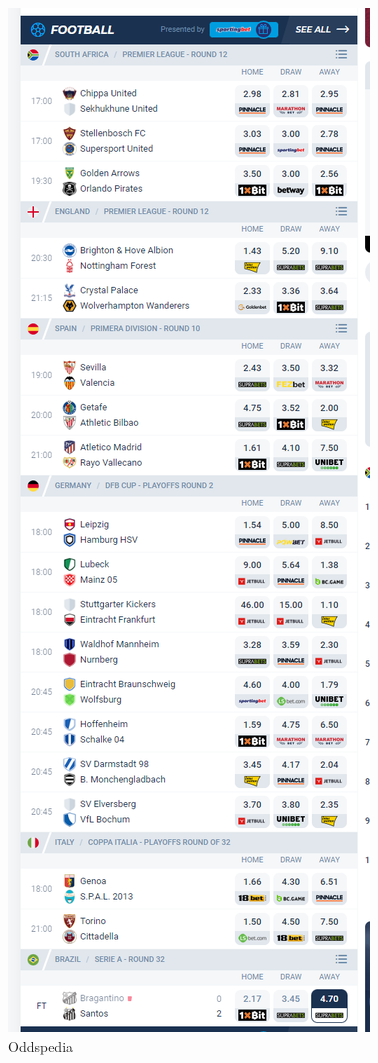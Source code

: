 \begin{figure}
    \centering
    \includegraphics[scale=0.55]{images/oddspedia.png}
    \caption{Oddspedia}
    \label{fig:oddspedia}
\end{figure}

